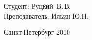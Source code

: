 \begin{titlepage}
\begin{titlepage}
\vspace{20em}

\begin{flushright}
Студент: Руцкий~В.\,В. \\
Преподаватель: Ильин Ю.П.
\end{flushright}

\vspace{\fill}

\begin{center}
Санкт-Петербург 2010
\end{center}

\end{titlepage}

\end{titlepage}

